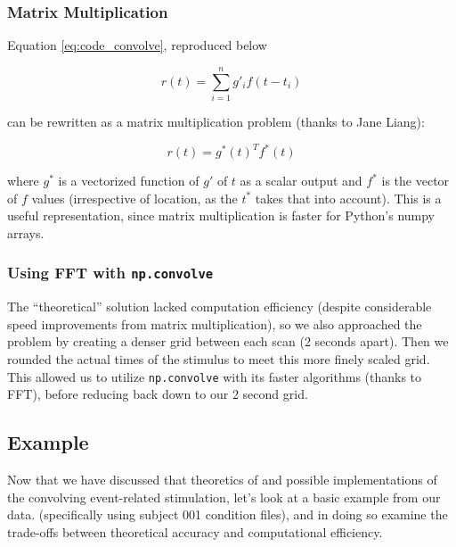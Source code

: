 \subsubsection{Matrix Multiplication}
Equation \ref{eq:code_convolve}, reproduced below

$$r(t)= \sum_{i=1}^n g'_{i} f(t-t_i)$$

can be rewritten as a matrix multiplication problem (thanks to Jane Liang):

\begin{equation} \label{eq:matrix_code_convolve}
r(t)=  g^*(t)^T f^*(t)
\end{equation}

where $g^*$ is a vectorized function of $g'$ of $t$ as a scalar output and 
$f^*$ is the vector of $f$ values (irrespective of location, as the $t^*$ 
takes that into account). This is a useful representation, since matrix 
multiplication is faster for Python's numpy arrays. 




\subsubsection{Using FFT with \texttt{np.convolve}}
The ``theoretical'' solution lacked computation efficiency (despite 
considerable speed improvements from matrix multiplication), so we also 
approached the problem by creating a denser grid between each scan (2 seconds 
apart). Then we rounded the actual times of the stimulus to meet this more 
finely scaled grid. This allowed us to utilize \texttt{np.convolve} with its 
faster algorithms (thanks to FFT), before reducing back down to our 2 second 
grid. 


\subsection{Example}

Now that we have discussed that theoretics of and possible implementations of the 
convolving event-related stimulation, let's look at a basic example from our data.
(specifically using subject 001 condition files), and in doing so examine the trade-offs
between theoretical accuracy and computational efficiency.


